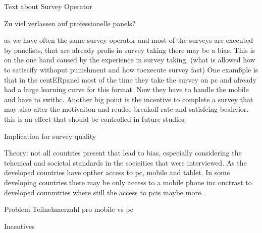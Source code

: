 Text about Survey Operator

Zu viel verlassen auf professionelle panels?


as we have often the same survey operator and most of the surveys are executed by panelists, that are already profis in survey taking there may be a bias. This is on the one hand caused by the experience in survey taking, (what is allowed how to satiscify withoput punishment and how toexecute survey fast) One examßple is that in the centERpanel most of the time they take the survey on pc and already had a large learning curve for this format. Now they have to handle the mobile and have to swithc. Another big point is the incentive to complete a survey that may also alter the motivaiton and reudce breakoff rate and satisfcing beahvior. this is an effect that should be controlled in future studies. 

Implication for survey quality

Theory: not all countries present that lead to bias, especially considering the tehcnical and societal standards in the socieities that were interviewed. As the developed countries have opther access to pc, mobile and tablet. In some developing countries there may be only access to a mobile phone inc onctrast to developed counmtries where still the access to pcis maybe more. 

Problem Teilnehmerzahl pro mobile vs pc 

Incentives

